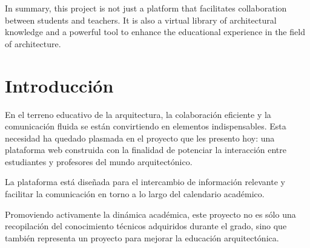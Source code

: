 \documentclass[a4paper, 12pt]{book}
\begin{document}
In summary, this project is not just a platform that facilitates collaboration between students and teachers. It is also a virtual 
library of architectural knowledge and a powerful tool to enhance the educational experience in the field of architecture.



\tableofcontents 
\cleardoublepage
\listoffigures %



\cleardoublepage
\chapter{Introducción}
\label{sec:intro} %

En el terreno educativo de la arquitectura, la colaboración eficiente y la comunicación fluida se están convirtiendo en elementos 
indispensables. Esta necesidad ha quedado plasmada en el proyecto que les presento hoy: una plataforma web construida con la finalidad 
de potenciar la interacción entre estudiantes y profesores del mundo arquitectónico.

La plataforma está diseñada para el intercambio de información relevante y facilitar la comunicación en torno a 
lo largo del calendario académico.

Promoviendo activamente la dinámica académica, este proyecto no es sólo una recopilación del conocimiento técnicos adquiridos durante 
el grado, sino que también representa un proyecto para mejorar la educación arquitectónica. 
\end{document}

